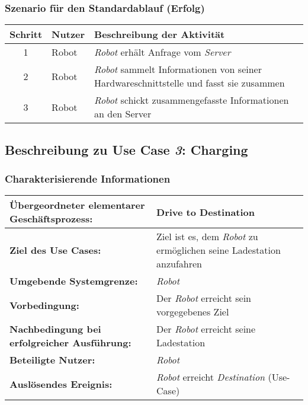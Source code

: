 			\subsubsection*{Szenario für den Standardablauf (Erfolg)}

			\begin{table}[H]
				\centering
				\begin{tabularx}{\textwidth}{@{}cp{2cm}X@{}}
				\toprule
				Schritt & Nutzer & Beschreibung der Aktivität \\ \midrule
				1 & Robot & \emph{Robot} erhält Anfrage vom \emph{Server} \\
				2 & Robot & \emph{Robot} sammelt Informationen von seiner Hardwareschnittstelle und fasst sie zusammen \\
				3 & Robot & \emph{Robot} schickt zusammengefasste Informationen an den Server \\
				\bottomrule
				\end{tabularx}
			\end{table}

			
		\pagebreak

		\subsection{Beschreibung zu Use Case \emph{3}: Charging}

			\subsubsection*{Charakterisierende Informationen}

			\begin{table}[H]
				\centering
				\begin{tabularx}{\textwidth}{@{}p{5cm}X@{}}
				\toprule
				\textbf{Übergeordneter elementarer Geschäftsprozess:} & Drive to Destination\\ \midrule
				\textbf{Ziel des Use Cases:} & Ziel ist es, dem \emph{Robot} zu ermöglichen seine Ladestation anzufahren\\ \midrule
				\textbf{Umgebende Systemgrenze:} & \emph{Robot}\\ \midrule
				\textbf{Vorbedingung:} & Der \emph{Robot} erreicht sein vorgegebenes Ziel\\ \midrule
				\textbf{Nachbedingung bei erfolgreicher Ausführung:} & Der \emph{Robot} erreicht seine Ladestation\\ \midrule
				\textbf{Beteiligte Nutzer:} & \emph{Robot}\\ \midrule
				\textbf{Auslösendes Ereignis:} & \emph{Robot} erreicht \emph{Destination} (Use-Case)\\
				\bottomrule
				\end{tabularx}
			\end{table}

